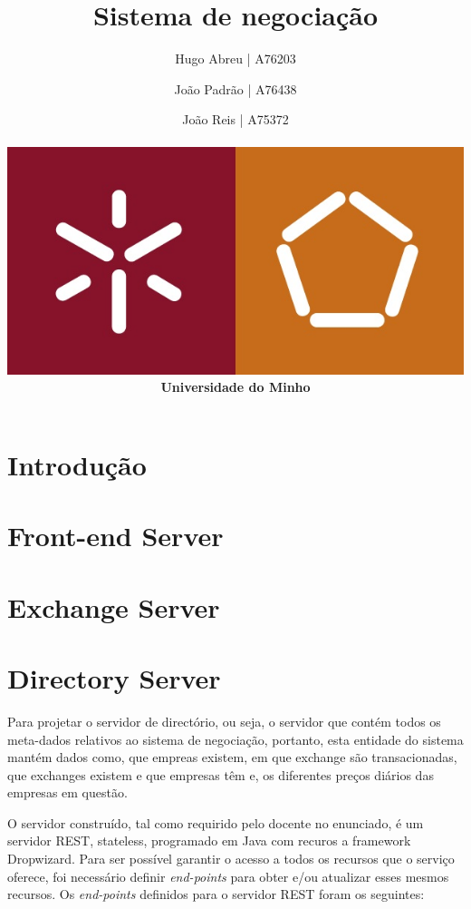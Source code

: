 \documentclass[a4paper,12pt]{article}
\title{Sistema de negociação}
\author{Hugo Abreu | A76203 \and João Padrão | A76438\and João Reis | A75372
\\\\ \includegraphics[scale=0.25]{um_eeng} \\ \textbf{Universidade do Minho}}
\begin{document}
\maketitle


\section{Introdução}

\section{Front-end Server}

\section{Exchange Server}

\section{Directory Server}
Para projetar o servidor de directório, ou seja, o servidor que contém todos os meta-dados relativos ao sistema de negociação, portanto, esta entidade do sistema mantém dados como, que empreas existem, em que exchange são transacionadas, que exchanges existem e que empresas têm e, os diferentes preços diários das empresas em questão.
\par O servidor construído, tal como requirido pelo docente no enunciado, é um servidor REST, stateless, programado em Java com recuros a framework Dropwizard. Para ser possível garantir o acesso a todos os recursos que o serviço oferece, foi necessário definir \textit{end-points} para obter e/ou atualizar esses mesmos recursos. Os \textit{end-points} definidos para o servidor REST foram os seguintes:
\end{document}
